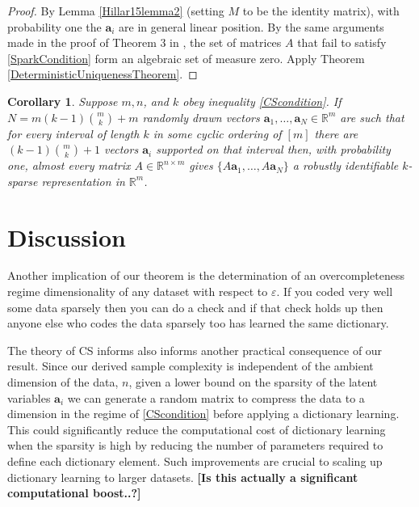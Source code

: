 \documentclass[journal, onecolumn]{IEEEtran}
\newtheorem{corollary}{Corollary}
\begin{document}
\begin{proof}
By Lemma \ref{Hillar15lemma2} (setting $M$ to be the identity matrix), with probability one the $\mathbf{a}_i$ are in general linear position. By the same arguments made in the proof of Theorem 3 in \cite{Hillar15}, the set of matrices $A$ that fail to satisfy \eqref{SparkCondition} form an algebraic set of measure zero. Apply Theorem \ref{DeterministicUniquenessTheorem}.
\end{proof}

\begin{corollary}
Suppose $m, n$, and $k$ obey inequality \eqref{CScondition}.  If $N = m(k-1){m \choose k}+m$ randomly drawn vectors $\mathbf{a}_1, \ldots, \mathbf{a}_N \in \mathbb{R}^m$ are such that for every interval of length $k$ in some cyclic ordering of $[m]$ there are $(k-1){m \choose k}+1$ vectors $\mathbf{a}_i$ supported on that interval then, with probability one, almost every matrix $A \in \mathbb{R}^{n \times m}$ gives $\{A\mathbf{a}_1, \ldots , A\mathbf{a}_N \}$ a robustly identifiable $k$-sparse representation in $\mathbb{R}^m$.
\end{corollary}



\section{Discussion}


Another implication of our theorem is the determination of an overcompleteness regime dimensionality of any dataset with respect to $\varepsilon$. If you coded very well some data sparsely then you can do a check and if that check holds up then anyone else who codes the data sparsely too has learned the same dictionary. 

The theory of CS informs also informs another practical consequence of our result. Since our derived sample complexity is independent of the ambient dimension of the data, $n$, given a lower bound on the sparsity of the latent variables $\mathbf{a}_i$ we can generate a random matrix to compress the data to a dimension in the regime of \eqref{CScondition} before applying a dictionary learning. This could significantly reduce the computational cost of dictionary learning when the sparsity is high by reducing the number of parameters required to define each dictionary element. Such improvements are crucial to scaling up dictionary learning to larger datasets. \textbf{[Is this actually a significant computational boost..?]}
\end{document}
